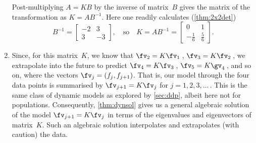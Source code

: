 \begin{example}
\begin{solution}
\begin{enumerate}
Post-multiplying \(A=KB\) by the inverse of matrix~\(B\) gives the matrix of the transformation as \(K=AB^{-1}\).
Here one readily calculates (\autoref{thm:2x2det})
\begin{equation*}
B^{-1}=\begin{bmatrix} -2&3\\3&-3 \end{bmatrix},
\quad\text{so}\quad
K=AB^{-1}=\begin{bmatrix} 0&1\\-\frac16& \frac56\end{bmatrix}.
\end{equation*}

\item\label{eg:2expfitc}
Since, for this matrix~\(K\), we know that \(\fv_2=K\fv_1\)\,, \(\fv_3=K\fv_2\)\,, we extrapolate into the future to predict \(\fv_4=K\fv_3\)\,, \(\fv_5=K\gv_4\)\,, and so on, where the vectors \(\fv_j=(f_j,f_{j+1})\).
That is, our model through the four data points is summarised by \(\fv_{j+1}=K\fv_j\) for \(j=1,2,3,\ldots\,\).
This is the same class of dynamic models as explored by \autoref{sec:ddp}, albeit here not for populations.
Consequently, \autoref{thm:dynsol} gives us a general algebraic solution of the model \(\fv_{j+1}=K\fv_j\) in terms of the eigenvalues and eigenvectors of matrix~\(K\).
Such an algebraic solution interpolates and extrapolates (with caution) the data.


\end{enumerate}
\end{solution}
\end{example}
